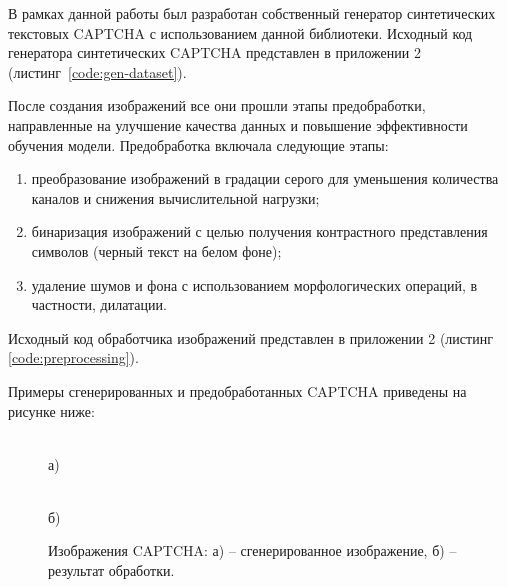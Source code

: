 В рамках данной работы был разработан собственный генератор синтетических 
текстовых CAPTCHA с использованием данной библиотеки. Исходный код генератора 
синтетических CAPTCHA представлен в приложении 2 (листинг~\ref{code:gen-dataset}).

После создания изображений все они прошли этапы предобработки, направленные на 
улучшение качества данных и повышение эффективности обучения модели. 
Предобработка включала следующие этапы:

\begin{enumerate}
    \item преобразование изображений в градации серого для уменьшения количества 
    каналов и снижения вычислительной нагрузки;
    \item бинаризация изображений с целью получения контрастного представления 
    символов (черный текст на белом фоне);
    \item удаление шумов и фона с использованием морфологических операций, в 
    частности, дилатации.
\end{enumerate}

Исходный код обработчика изображений представлен в приложении 2 (листинг~
\ref{code:preprocessing}).

Примеры сгенерированных и предобработанных CAPTCHA приведены на рисунке ниже:

\begin{figure}[H]
    \centering
    \begin{minipage}[h]{0.45\linewidth}
        \\ а)
    \end{minipage}
    \begin{minipage}[h]{0.45\linewidth}
        \\ б)
    \end{minipage}
    \caption{Изображения CAPTCHA: а) -- сгенерированное изображение, б) -- результат обработки.}
    \label{fig:example-captcha}
\end{figure}


